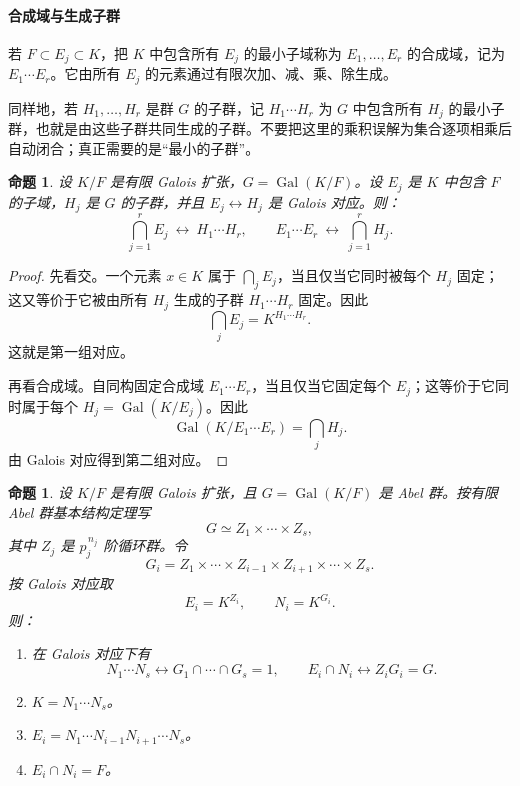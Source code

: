 \documentclass[11pt,a4paper,openany]{ctexbook}
\numberwithin{equation}{chapter}
\newcommand{\Gal}{\operatorname{Gal}}
\theoremstyle{plain}
\newtheorem{proposition}[theorem]{命题}
\theoremstyle{definition}
\theoremstyle{remark}
\begin{document}
\paragraph{合成域与生成子群}
若 $F\subset E_j\subset K$，把 $K$ 中包含所有 $E_j$ 的最小子域称为 $E_1,\dots,E_r$ 的合成域，记为 $E_1\cdots E_r$。它由所有 $E_j$ 的元素通过有限次加、减、乘、除生成。

同样地，若 $H_1,\dots,H_r$ 是群 $G$ 的子群，记 $H_1\cdots H_r$ 为 $G$ 中包含所有 $H_j$ 的最小子群，也就是由这些子群共同生成的子群。不要把这里的乘积误解为集合逐项相乘后自动闭合；真正需要的是“最小的子群”。

\begin{proposition}
设 $K/F$ 是有限 Galois 扩张，$G=\Gal(K/F)$。设 $E_j$ 是 $K$ 中包含 $F$ 的子域，$H_j$ 是 $G$ 的子群，并且 $E_j\leftrightarrow H_j$ 是 Galois 对应。则：
\[
\bigcap_{j=1}^r E_j\ \longleftrightarrow\ H_1\cdots H_r,
\qquad
E_1\cdots E_r\ \longleftrightarrow\ \bigcap_{j=1}^r H_j.
\]
\end{proposition}

\begin{proof}
先看交。一个元素 $x\in K$ 属于 $\bigcap_j E_j$，当且仅当它同时被每个 $H_j$ 固定；这又等价于它被由所有 $H_j$ 生成的子群 $H_1\cdots H_r$ 固定。因此
\[
\bigcap_j E_j=K^{H_1\cdots H_r}.
\]
这就是第一组对应。

再看合成域。自同构固定合成域 $E_1\cdots E_r$，当且仅当它固定每个 $E_j$；这等价于它同时属于每个 $H_j=\Gal(K/E_j)$。因此
\[
\Gal(K/E_1\cdots E_r)=\bigcap_j H_j.
\]
由 Galois 对应得到第二组对应。
\end{proof}

\begin{proposition}
设 $K/F$ 是有限 Galois 扩张，且 $G=\Gal(K/F)$ 是 Abel 群。按有限 Abel 群基本结构定理写
\[
G\simeq Z_1\times\cdots\times Z_s,
\]
其中 $Z_j$ 是 $p_j^{\,n_j}$ 阶循环群。令
\[
G_i=Z_1\times\cdots\times Z_{i-1}\times Z_{i+1}\times\cdots\times Z_s.
\]
按 Galois 对应取
\[
E_i=K^{Z_i},\qquad N_i=K^{G_i}.
\]
则：
\begin{enumerate}[label=(\arabic*)]
\item 在 Galois 对应下有
\[
N_1\cdots N_s\leftrightarrow G_1\cap\cdots\cap G_s=1,
\qquad
E_i\cap N_i\leftrightarrow Z_iG_i=G.
\]
\item $K=N_1\cdots N_s$。
\item $E_i=N_1\cdots N_{i-1}N_{i+1}\cdots N_s$。
\item $E_i\cap N_i=F$。
\end{enumerate}
\end{proposition}
\end{document}
